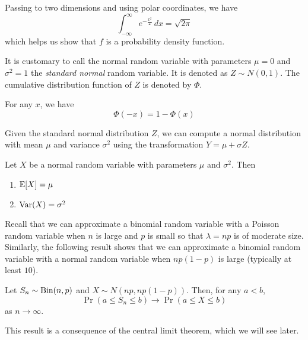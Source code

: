 \documentclass{article}
\begin{document}
\begin{remark}
  Passing to two dimensions and using polar coordinates, we have
  \[
    \int_{-\infty}^{\infty} e^{-\frac{x^2}{2}} \, dx = \sqrt{2 \pi}
  \]
  which helps us show that $f$ is a probability density function.
\end{remark}

\begin{definition}
  It is customary to call the normal random variable with parameters $\mu = 0$ and $\sigma^2 = 1$ the \emph{standard normal} random variable.
  It is denoted as $Z \sim N(0, 1)$.
  The cumulative distribution function of $Z$ is denoted by $\Phi$.
\end{definition}

\begin{remark}
  For any $x$, we have
  \[
    \Phi (-x) = 1 - \Phi(x)
  \]
\end{remark}

\begin{remark}
  Given the standard normal distribution $Z$, we can compute a normal distribution with mean $\mu$ and variance $\sigma^2$ using the transformation $Y = \mu + \sigma Z$.
\end{remark}

\begin{proposition}
  Let $X$ be a normal random variable with parameters $\mu$ and $\sigma^2$.
  Then
  \begin{enumerate}
    \item $\operatorname{E}[X] = \mu$
    \item $\operatorname{Var}(X) = \sigma^2$
  \end{enumerate}
\end{proposition}

Recall that we can approximate a binomial random variable with a Poisson random variable when $n$ is large and $p$ is small so that $\lambda = np$ is of moderate size.
Similarly, the following result shows that we can approximate a binomial random variable with a normal random variable when $np(1 - p)$ is large (typically at least $10$).

\begin{theorem}
  Let $S_n \sim \textnormal{Bin}(n, p)$ and $X \sim N(np, np(1 - p))$.
  Then, for any $a < b$,
  \[
    \Pr(a \leq S_n \leq b) \to \Pr(a \leq X \leq b)
  \]
  as $n \to \infty$.
\end{theorem}
This result is a consequence of the central limit theorem, which we will see later.
\end{document}
